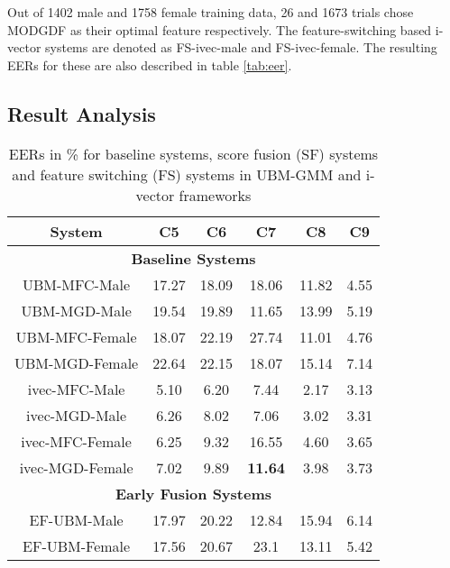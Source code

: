 \documentclass{article}
\begin{document}
Out of 1402 male and 1758 female training data, 26 and 1673
trials chose MODGDF as their optimal feature respectively.
The feature-switching based i-vector systems are denoted as 
FS-ivec-male and FS-ivec-female. The resulting EERs for these are also described in table \ref{tab:eer}.

\subsection{Result Analysis}
\label{subsec:resAnalysis}

\begin{table}[h]
	\centering
	\caption{EERs in \% for baseline systems, score fusion (SF) systems and
	feature switching (FS) systems in UBM-GMM and i-vector frameworks}
	\begin{tabular}{|c|c|c|c|c|c|} \hline
 {\bf System} & {\bf C5 } &  {\bf C6} & {\bf C7} & {\bf C8}  & {\bf C9  }\\ \hline \hline
\multicolumn{6}{|c|}{\bf Baseline Systems} \\ \hline
UBM-MFC-Male & 17.27 & 18.09 & 18.06 & 11.82 & 4.55 \\ \hline

UBM-MGD-Male & 19.54 & 19.89 & 11.65 & 13.99 & 5.19 \\ \hline

{UBM-MFC-Female} & 18.07 & 22.19 & 27.74 & 11.01 & 4.76 \\ \hline

{UBM-MGD-Female} & 22.64 & 22.15 & 18.07 & 15.14 & 7.14 \\ \hline

{ivec-MFC-Male} & 5.10 & 6.20 & 7.44 & 2.17 & 3.13 \\ \hline

{ivec-MGD-Male} &  6.26 & 8.02 & 7.06 & 3.02 & 3.31  \\ \hline

{ivec-MFC-Female} & 6.25 & 9.32 & 16.55 & 4.60 & 3.65 \\ \hline

{ivec-MGD-Female} & 7.02 & 9.89 & {\bf 11.64} & 3.98 & 3.73 \\ \hline 

\multicolumn{6}{|c|}{\bf Early Fusion Systems} \\ \hline

{EF-UBM-Male} & 17.97 & 20.22 & 12.84 & 15.94 & 6.14\\ \hline

{EF-UBM-Female} & 17.56 & 20.67  & 23.1  & 13.11 & 5.42  \\ \hline


\end{tabular}
\end{table}
\end{document}
